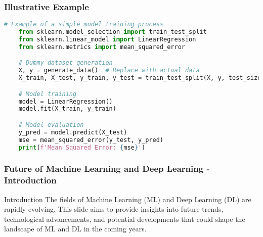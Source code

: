 \documentclass[aspectratio=169]{beamer}
\begin{document}
\begin{frame}[fragile]
    \frametitle{Illustrative Example}
    \begin{lstlisting}[language=Python]
    # Example of a simple model training process
    from sklearn.model_selection import train_test_split
    from sklearn.linear_model import LinearRegression
    from sklearn.metrics import mean_squared_error

    # Dummy dataset generation
    X, y = generate_data()  # Replace with actual data
    X_train, X_test, y_train, y_test = train_test_split(X, y, test_size=0.2, random_state=42)

    # Model training
    model = LinearRegression()
    model.fit(X_train, y_train)

    # Model evaluation
    y_pred = model.predict(X_test)
    mse = mean_squared_error(y_test, y_pred)
    print(f'Mean Squared Error: {mse}')
    \end{lstlisting}
\end{frame}

\begin{frame}[fragile]
    \frametitle{Future of Machine Learning and Deep Learning - Introduction}
    \begin{block}{Introduction}
        The fields of Machine Learning (ML) and Deep Learning (DL) are rapidly evolving. 
        This slide aims to provide insights into future trends, technological advancements, and potential developments that could shape the landscape of ML and DL in the coming years.
    \end{block}
\end{frame}
\end{document}
